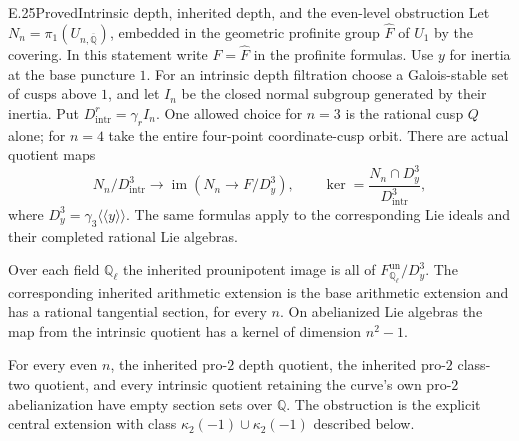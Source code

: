 \begin{statement}{E.25}{Proved}{Intrinsic depth, inherited depth, and the even-level obstruction}
Let $N_n=\pi_1(U_{n,\overline{\mathbb Q}})$, embedded in the
geometric profinite group $\widehat F$ of $U_1$ by the covering.
In this statement write $F=\widehat F$ in the profinite formulas.
Use $y$ for
inertia at the base puncture $1$.
For an intrinsic depth filtration choose a Galois-stable set of
cusps above $1$, and let $I_n$ be the closed normal subgroup
generated by their inertia. Put $D_{\mathrm{intr}}^r=\gamma_r I_n$.
One allowed choice for $n=3$ is the rational cusp $Q$ alone;
for $n=4$ take the entire four-point coordinate-cusp orbit.
There are actual quotient maps
\[
 N_n/D_{\mathrm{intr}}^3
   \longrightarrow
 \operatorname{im}(N_n\longrightarrow F/D_y^3),
 \qquad
 \ker=\frac{N_n\cap D_y^3}{D_{\mathrm{intr}}^3},
 \tag{E25.1}
\]
where $D_y^3=\gamma_3\langle\!\langle y\rangle\!\rangle$.
The same formulas apply to the corresponding Lie ideals and
their completed rational Lie algebras.

Over each field $\mathbb Q_\ell$ the inherited prounipotent
image is all of $F_{\mathbb Q_\ell}^{\mathrm{un}}/D_y^3$.
The corresponding inherited arithmetic extension is the base
arithmetic extension and has a rational tangential section,
for every $n$. On abelianized Lie algebras the map from the
intrinsic quotient has a kernel of dimension $n^2-1$.

For every even $n$, the inherited pro-$2$ depth quotient,
the inherited pro-$2$ class-two quotient, and every intrinsic
quotient retaining the curve's own pro-$2$ abelianization have
empty section sets over $\mathbb Q$.
The obstruction is the explicit central extension with class
$\kappa_2(-1)\cup\kappa_2(-1)$ described below.
\end{statement}
